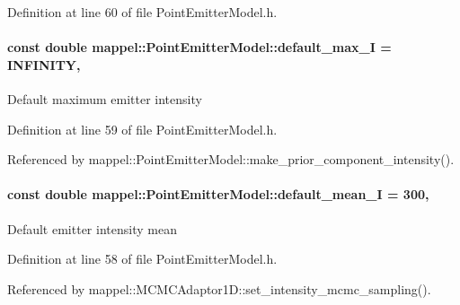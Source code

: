 Definition at line 60 of file Point\+Emitter\+Model.\+h.

\paragraph[{\texorpdfstring{default\+\_\+max\+\_\+I}{default_max_I}}]{\setlength{\rightskip}{0pt plus 5cm}const double mappel\+::\+Point\+Emitter\+Model\+::default\+\_\+max\+\_\+I = I\+N\+F\+I\+N\+I\+TY\hspace{0.3cm}{\ttfamily [static]}, {\ttfamily [inherited]}}\hypertarget{classmappel_1_1PointEmitterModel_acca80757a9a285a9e6eedea167d038c7}{}\label{classmappel_1_1PointEmitterModel_acca80757a9a285a9e6eedea167d038c7}
Default maximum emitter intensity 

Definition at line 59 of file Point\+Emitter\+Model.\+h.



Referenced by mappel\+::\+Point\+Emitter\+Model\+::make\+\_\+prior\+\_\+component\+\_\+intensity().

\paragraph[{\texorpdfstring{default\+\_\+mean\+\_\+I}{default_mean_I}}]{\setlength{\rightskip}{0pt plus 5cm}const double mappel\+::\+Point\+Emitter\+Model\+::default\+\_\+mean\+\_\+I = 300\hspace{0.3cm}{\ttfamily [static]}, {\ttfamily [inherited]}}\hypertarget{classmappel_1_1PointEmitterModel_a575dd30a0afb886db82ac725c8cc8df3}{}\label{classmappel_1_1PointEmitterModel_a575dd30a0afb886db82ac725c8cc8df3}
Default emitter intensity mean 

Definition at line 58 of file Point\+Emitter\+Model.\+h.



Referenced by mappel\+::\+M\+C\+M\+C\+Adaptor1\+D\+::set\+\_\+intensity\+\_\+mcmc\+\_\+sampling().

